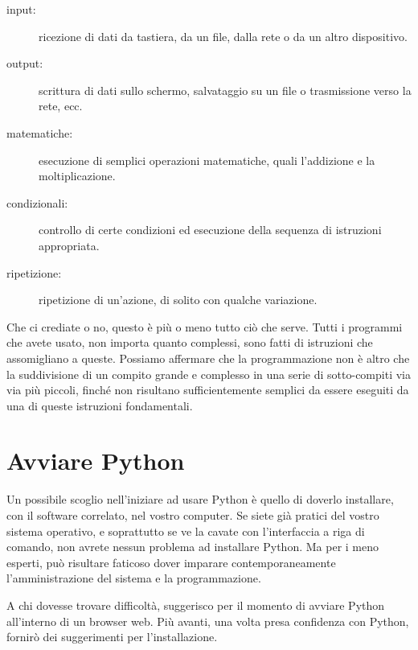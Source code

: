 \documentclass[10pt]{book}
\begin{document}
\begin{description}

\item[input:] ricezione di dati da tastiera, da un file, dalla rete o da un altro dispositivo.

\item[output:] scrittura di dati sullo schermo, salvataggio su un file o trasmissione verso la rete, ecc.

\item[matematiche:] esecuzione di semplici operazioni matematiche, quali        l'addizione e la moltiplicazione.

\item[condizionali:] controllo di certe condizioni ed esecuzione della       sequenza di istruzioni appropriata.

\item[ripetizione:] ripetizione di un'azione, di solito con qualche      variazione.

\end{description}

Che ci crediate o no, questo è più o meno tutto ciò che serve. Tutti i   programmi che avete usato, non importa quanto complessi, sono fatti di istruzioni che assomigliano a queste. Possiamo affermare che la programmazione non è altro che la suddivisione di un compito grande e complesso in una serie di sotto-compiti via via più piccoli, finché non risultano sufficientemente semplici da essere eseguiti da una di queste istruzioni fondamentali.

\section{Avviare Python}

Un possibile scoglio nell'iniziare ad usare Python è quello di doverlo installare, con il software correlato, nel vostro computer. Se siete già pratici del vostro sistema operativo, e soprattutto se ve la cavate con l'interfaccia a riga di comando, non avrete nessun problema ad installare Python. Ma per i meno esperti, può risultare faticoso dover imparare contemporaneamente l'amministrazione del sistema e la programmazione.

A chi dovesse trovare difficoltà, suggerisco per il momento di avviare Python all'interno di un browser web. Più avanti, una volta presa confidenza con Python, fornirò dei suggerimenti per l'installazione.
\end{document}
